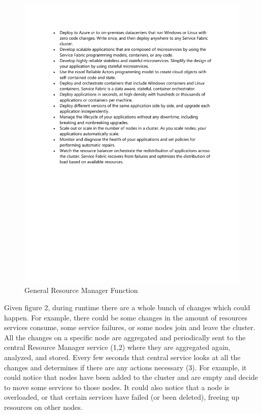 \begin{figure}[!ht]
  \centering\includegraphics[width=\columnwidth]{images/fig2.pdf}
  \caption{General Resource Manager Function}
\label{f:architecture}
\end{figure}

Given figure 2, during runtime there are a whole bunch of changes
which could happen. For example, there could be some changes in the
amount of resources services consume, some service failures, or some
nodes join and leave the cluster. All the changes on a specific node
are aggregated and periodically sent to the central Resource Manager
service (1,2) where they are aggregated again, analyzed, and stored.
Every few seconds that central service looks at all the changes and
determines if there are any actions necessary (3). For example, it
could notice that nodes have been added to the cluster and are empty
and decide to move some services to those nodes. It could also notice
that a node is overloaded, or that certain services have failed (or
been deleted), freeing up resources on other nodes.

